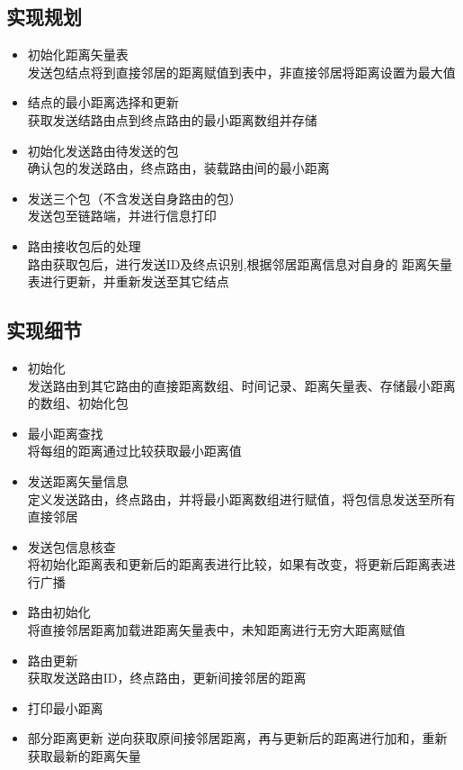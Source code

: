 \documentclass[UTF8,14pt]{article}
\numberwithin{figure}{section}
\begin{document}
\subsection{实现规划}
\begin{itemize}
    \setlength{\itemsep}{0pt}
          \setlength{\parsep}{0pt}
          \setlength{\parskip}{0pt}
    \item 初始化距离矢量表\\
          发送包结点将到直接邻居的距离赋值到表中，非直接邻居将距离设置为最大值
    \item 结点的最小距离选择和更新\\
          获取发送结路由点到终点路由的最小距离数组并存储
    \item 初始化发送路由待发送的包\\
          确认包的发送路由，终点路由，装载路由间的最小距离
    \item 发送三个包（不含发送自身路由的包）\\
          发送包至链路端，并进行信息打印
    \item 路由接收包后的处理\\
          路由获取包后，进行发送ID及终点识别,根据邻居距离信息对自身的
          距离矢量表进行更新，并重新发送至其它结点
\end{itemize}
\subsection{实现细节}
\begin{itemize}
    \item 初始化\\
          发送路由到其它路由的直接距离数组、时间记录、距离矢量表、存储最小距离的数组、初始化包
    \item 最小距离查找\\
          将每组的距离通过比较获取最小距离值
    \item 发送距离矢量信息\\
          定义发送路由，终点路由，并将最小距离数组进行赋值，将包信息发送至所有直接邻居
    \item 发送包信息核查\\
          将初始化距离表和更新后的距离表进行比较，如果有改变，将更新后距离表进行广播
    \item 路由初始化\\
          将直接邻居距离加载进距离矢量表中，未知距离进行无穷大距离赋值
    \item 路由更新\\
          获取发送路由ID，终点路由，更新间接邻居的距离
    \item 打印最小距离
    \item 部分距离更新
          逆向获取原间接邻居距离，再与更新后的距离进行加和，重新获取最新的距离矢量
\end{itemize}
\end{document}
